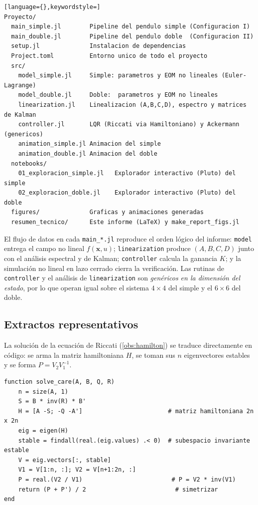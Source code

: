 \documentclass[11pt,letterpaper]{article}
\theoremstyle{definition}
\theoremstyle{plain}
\theoremstyle{remark}
\newcommand{\xv}{\bm{x}}
\begin{document}
\begin{lstlisting}[language={},keywordstyle=]
Proyecto/
  main_simple.jl        Pipeline del pendulo simple (Configuracion I)
  main_double.jl        Pipeline del pendulo doble  (Configuracion II)
  setup.jl              Instalacion de dependencias
  Project.toml          Entorno unico de todo el proyecto
  src/
    model_simple.jl     Simple: parametros y EOM no lineales (Euler-Lagrange)
    model_double.jl     Doble:  parametros y EOM no lineales
    linearization.jl    Linealizacion (A,B,C,D), espectro y matrices de Kalman
    controller.jl       LQR (Riccati via Hamiltoniano) y Ackermann (genericos)
    animation_simple.jl Animacion del simple
    animation_double.jl Animacion del doble
  notebooks/
    01_exploracion_simple.jl   Explorador interactivo (Pluto) del simple
    02_exploracion_doble.jl    Explorador interactivo (Pluto) del doble
  figures/              Graficas y animaciones generadas
  resumen_tecnico/      Este informe (LaTeX) y make_report_figs.jl
\end{lstlisting}

El flujo de datos en cada \texttt{main\_*.jl} reproduce el orden lógico del
informe: \texttt{model} entrega el campo no lineal $f(\xv,u)$;
\texttt{linearization} produce $(A,B,C,D)$ junto con el análisis espectral y de
Kalman; \texttt{controller} calcula la ganancia $K$; y la simulación no lineal
en lazo cerrado cierra la verificación. Las rutinas de \texttt{controller} y el
análisis de \texttt{linearization} son \emph{genéricos en la dimensión del
estado}, por lo que operan igual sobre el sistema $4\times4$ del simple y el
$6\times6$ del doble.

\subsection*{Extractos representativos}

La solución de la ecuación de Riccati (\cref{obs:hamilton}) se traduce
directamente en código: se arma la matriz hamiltoniana $H$, se toman sus $n$
eigenvectores estables y se forma $P=V_2V_1^{-1}$.

\begin{lstlisting}
function solve_care(A, B, Q, R)
    n = size(A, 1)
    S = B * inv(R) * B'
    H = [A -S; -Q -A']                        # matriz hamiltoniana 2n x 2n
    eig = eigen(H)
    stable = findall(real.(eig.values) .< 0)  # subespacio invariante estable
    V = eig.vectors[:, stable]
    V1 = V[1:n, :]; V2 = V[n+1:2n, :]
    P = real.(V2 / V1)                         # P = V2 * inv(V1)
    return (P + P') / 2                         # simetrizar
end
\end{lstlisting}
\end{document}
